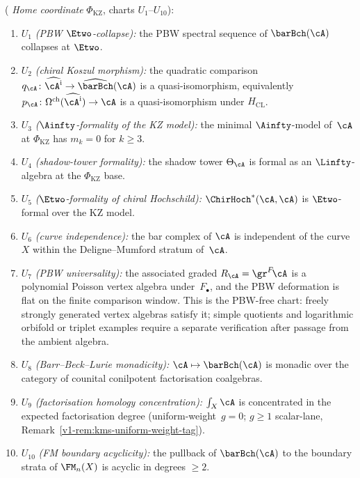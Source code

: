 \begin{theorem}
\smallskip
\noindent\textup{(} \emph{Home coordinate}
$\Phi_{\mathrm{KZ}}$, charts $U_1$--$U_{10}$\textup{):}
\begin{enumerate}[label=\textup{(\roman*)},leftmargin=2.4em]
\item $U_1$ \emph{(PBW $\Etwo$-collapse):}
 the PBW spectral sequence of
 $\barBch(\cA)$ collapses at $\Etwo$.
\item $U_2$ \emph{(chiral Koszul morphism):}
 the quadratic comparison
 $q_\cA\colon\widehat{\cA^{\mathrm i}}\to
 \widehat{\barBch}(\cA)$ is a quasi-isomorphism, equivalently
 $p_\cA\colon\Omega^{\mathrm{ch}}(\widehat{\cA^{\mathrm i}})
 \to\cA$ is a quasi-isomorphism under $H_{\mathrm{CL}}$.
\item $U_3$ \emph{($\Ainfty$-formality of the KZ model):}
 the minimal $\Ainfty$-model of~$\cA$ at $\Phi_{\mathrm{KZ}}$
 has $m_k=0$ for $k\geq 3$.
\item $U_4$ \emph{(shadow-tower formality):}
 the shadow tower $\Theta_\cA$ is formal as an
 $\Linfty$-algebra at the $\Phi_{\mathrm{KZ}}$ base.
\item $U_5$ \emph{($\Etwo$-formality of chiral Hochschild):}
 $\ChirHoch^*(\cA,\cA)$ is $\Etwo$-formal over the KZ model.
\item $U_6$ \emph{(curve independence):} the bar complex of
 $\cA$ is independent of the curve~$X$ within the
 Deligne--Mumford stratum of~$\cA$.
\item $U_7$ \emph{(PBW universality):}
 the associated graded $R_\cA = \gr^F\!\cA$ is a
 polynomial Poisson vertex algebra under~$F_\bullet$, and the
 PBW deformation is flat on the finite comparison window. This
 is the PBW-free chart: freely strongly generated vertex
 algebras satisfy it; simple quotients and logarithmic orbifold or
 triplet examples require a separate verification after passage from
 the ambient algebra.
\item $U_8$ \emph{(Barr--Beck--Lurie monadicity):}
 $\cA \mapsto \barBch(\cA)$ is monadic over the category of
 counital conilpotent factorisation coalgebras.
\item $U_9$ \emph{(factorisation homology concentration):}
 $\int_X \cA$ is concentrated in the expected factorisation
 degree (uniform-weight~$g=0$; $g\geq 1$
 scalar-lane, Remark~\ref{v1-rem:kms-uniform-weight-tag}).
\item $U_{10}$ \emph{(FM boundary acyclicity):} the pullback of
 $\barBch(\cA)$ to the boundary strata of $\FM_n(X)$ is
 acyclic in degrees $\geq 2$.
\end{enumerate}


\end{theorem}
